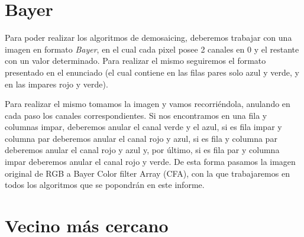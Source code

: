 \documentclass[10pt, a4paper]{article}
\begin{document}
\section{Bayer}

Para poder realizar los algoritmos de demosaicing, deberemos trabajar con una imagen en formato \textit{Bayer}, en el cual cada pixel posee 2 canales en 0 y el restante con un valor determinado. Para realizar el mismo seguiremos el formato presentado en el enunciado (el cual contiene en las filas pares solo azul y verde, y en las impares rojo y verde). 

Para realizar el mismo tomamos la imagen y vamos recorri\'endola, anulando en cada paso los canales correspondientes. Si nos encontramos en una fila y columnas impar, deberemos anular el canal verde y el azul, si es fila impar y columna par deberemos anular el canal rojo y azul, si es fila y columna par deberemos anular el canal rojo y azul y, por \'ultimo, si es fila par y columna impar deberemos anular el canal rojo y verde. De esta forma pasamos la imagen original de RGB a Bayer Color filter Array (CFA), con la que trabajaremos en todos los algoritmos que se popondr\'an en este informe.

\section{Vecino m\'as cercano}
\end{document}
